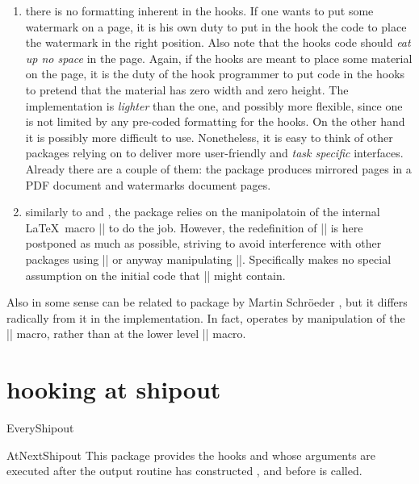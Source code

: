 \begin{enumerate}
 \item there is no formatting inherent in the hooks. If one wants to
   put some watermark on a page, it is his own duty to put in the
   hook the code to place the watermark in the right position. Also
   note that the hooks code should \emph{eat up no space} in the
   page.  Again, if the hooks are meant to place some material on the
   page, it is the duty of the hook programmer to put code in the
   hooks to pretend that the material has zero width and zero height.
   The implementation is \emph{lighter} than the  one,
   and possibly more flexible, since one is not limited by any
   pre-coded formatting for the hooks. On the other hand it is
   possibly more difficult to use. Nonetheless, it is easy to think
   of other packages relying on  to deliver more
   user-friendly and \emph{task specific} interfaces. Already there
   are a couple of them: the package  produces
   mirrored pages in a PDF document and 
   watermarks document pages.
 \item similarly to  and , the
   package relies on the manipolatoin of the internal \LaTeX\ macro
   |\@begindvi| to do the job. However, the redefinition of
   |\@begindvi| is here postponed as much as possible, striving to
   avoid interference with other packages using |\AtBeginDvi| or
   anyway manipulating |\@begindvi|. Specifically 
   makes no special assumption on the initial code that |\@begindvi|
   might contain.
 \end{enumerate}



Also in some sense  can be related to package
  by Martin Schr\"oeder \cite{everyshi}, but it differs radically from
 it in the implementation. In fact, operates by
 manipulation of the |\@begindvi| macro, rather than at the
 lower level |\shipout| macro.

\section{hooking at shipout}

\begin{docCmd} {EveryShipout} {}
\begin{docCmd} {AtNextShipout} {}
This package provides the hooks  and 
   whose arguments are executed after the output 
  routine has constructed , and before  is 
  called.
\end{docCmd}
\end{docCmd}

